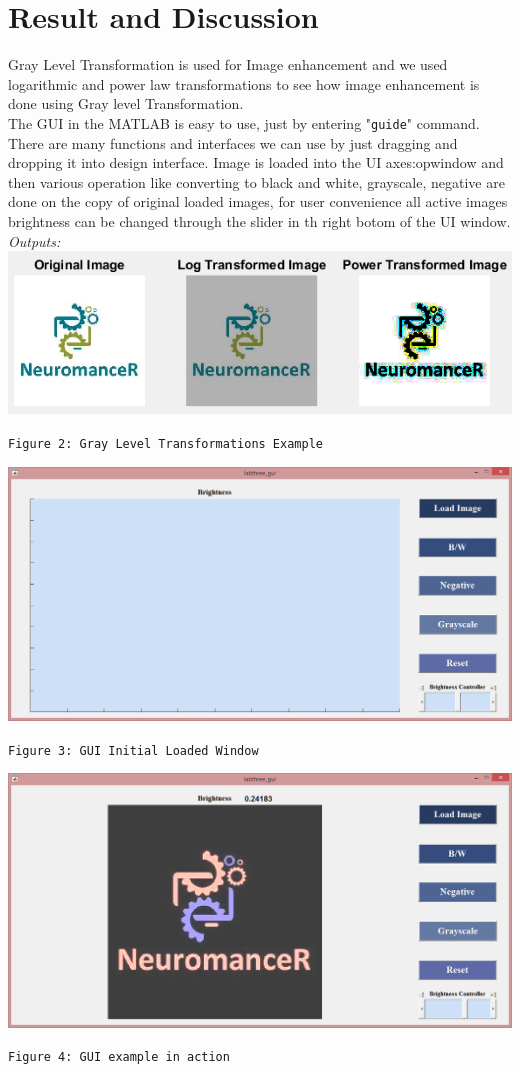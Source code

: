 \documentclass[12pt]{article}
\begin{document}
\section{Result and Discussion}
Gray Level Transformation is used for Image enhancement  and we used logarithmic and power law transformations to see how image enhancement is done using Gray level Transformation.\\
The GUI in the MATLAB is easy to use, just by entering "\texttt{guide}" command. There are many functions and interfaces we can use by just dragging and dropping it into design interface. Image is loaded into the UI axes:opwindow and then various operation like converting to black and white, grayscale, negative are done on the copy of original loaded images, for user convenience all active images brightness can be changed through the slider in th right botom of the UI window.\\
\emph{Outputs:}\\

\includegraphics[scale=1.0]{output_labthree_1.png}
{\centering
\texttt{Figure 2:  Gray Level Transformations Example}\par}
\includegraphics[scale=0.4]{output_labthree_2.png}
{\centering
\texttt{Figure 3: GUI Initial Loaded Window}\par}
\includegraphics[scale=0.4]{output_labthree_3.png}
{\centering\texttt{Figure 4: GUI example in action}\par}
\end{document}
